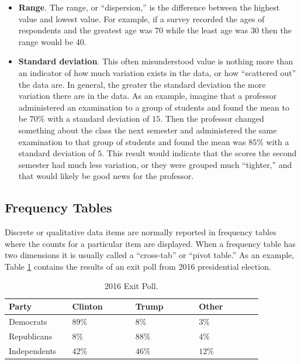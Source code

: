 \begin{itemize}
	\item \textbf{Range}. The range, or ``dispersion,'' is the difference between the highest value and lowest value. For example, if a survey recorded the ages of respondents and the greatest age was 70 while the least age was 30 then the range would be 40. 

	\item \textbf{Standard deviation}. This often misunderstood value is nothing more than an indicator of how much variation exists in the data, or how ``scattered out'' the data are. In general, the greater the standard deviation the more variation there are in the data. As an example, imagine that a professor administered an examination to a group of students and found the mean to be $ 70\% $ with a standard deviation of $ 15 $. Then the professor changed something about the class the next semester and administered the same examination to that group of students and found the mean was $ 85\% $ with a standard deviation of $ 5 $. This result would indicate that the scores the second semester had much less variation, or they were grouped much ``tighter,'' and that would likely be good news for the professor.
\end{itemize}

\subsection{Frequency Tables}

Discrete or qualitative data items are normally reported in frequency tables where the counts for a particular item are displayed. When a frequency table has two dimensions it is usually called a ``cross-tab'' or ``pivot table.'' As an example, Table \ref{tab06.02} contains the results of an exit poll from 2016 presidential election. \cite{cnn2016election}

\begin{table}[H]
	\centering
	\begin{tabularx}{0.95\linewidth}{
			p{0.22\linewidth}
			p{0.22\linewidth}
			p{0.22\linewidth}
			p{0.22\linewidth}}
		\toprule
		\textbf{Party} & \textbf{Clinton} & \textbf{Trump} & \textbf{Other} \\
		\midrule
		Democrats & $ 89\% $ & $ 8\% $ & $ 3\% $ \\
		Republicans & $ 8\% $ & $ 88\% $ & $ 4\% $ \\
		Independents & $ 42\% $ & $ 46\% $ & $ 12\% $ \\
		\bottomrule
	\end{tabularx}
	\caption{2016 Exit Poll.}
	\label{tab06.02}
\end{table}

